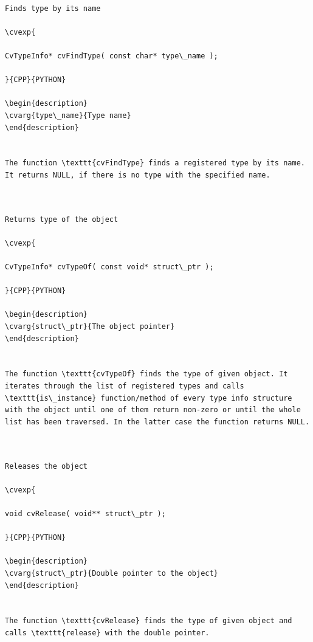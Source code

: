 \label{FindType}
\begin{verbatim}

Finds type by its name

\cvexp{

CvTypeInfo* cvFindType( const char* type\_name );

}{CPP}{PYTHON}

\begin{description}
\cvarg{type\_name}{Type name}
\end{description}


The function \texttt{cvFindType} finds a registered type by its name. It returns NULL, if there is no type with the specified name.


\end{verbatim}
\label{TypeOf}
\begin{verbatim}

Returns type of the object

\cvexp{

CvTypeInfo* cvTypeOf( const void* struct\_ptr );

}{CPP}{PYTHON}

\begin{description}
\cvarg{struct\_ptr}{The object pointer}
\end{description}


The function \texttt{cvTypeOf} finds the type of given object. It iterates through the list of registered types and calls \texttt{is\_instance} function/method of every type info structure with the object until one of them return non-zero or until the whole list has been traversed. In the latter case the function returns NULL.


\end{verbatim}
\label{Release}
\begin{verbatim}

Releases the object

\cvexp{

void cvRelease( void** struct\_ptr );

}{CPP}{PYTHON}

\begin{description}
\cvarg{struct\_ptr}{Double pointer to the object}
\end{description}


The function \texttt{cvRelease} finds the type of given object and calls \texttt{release} with the double pointer.


\end{verbatim}
